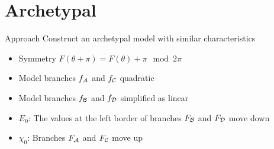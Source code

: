 \section{Archetypal}

\begin{frame}{Approach}
	\vspace{-1em}
	Construct an archetypal model with similar characteristics
	\pause
	\begin{itemize}
		\item Symmetry $F(\theta + \pi) = F(\theta) + \pi \mod 2\pi$ \hfill \cite{akyuz2022} \pause
		\item Model branches $f_{\mathcal{A}}$ and $f_{\mathcal{C}}$ quadratic
		\item Model branches $f_{\mathcal{B}}$ and $f_{\mathcal{D}}$ simplified as linear \pause
		\item $E_0$: The values at the left border of branches $F_{\mathcal{B}}$ and $F_{\mathcal{D}}$ move down
		\item $\chi_0$: Branches $F_{\mathcal{A}}$ and $F_{\mathcal{C}}$ move up
	\end{itemize}

	\begin{figure}
	\end{figure}
\end{frame}

